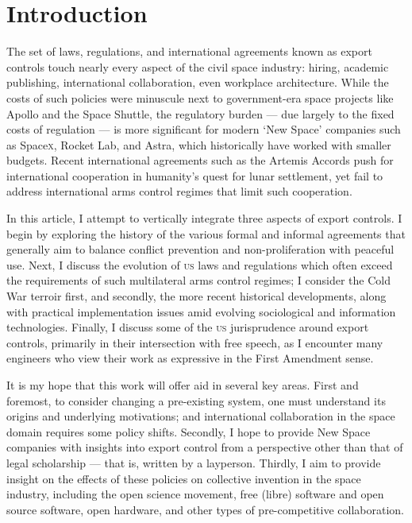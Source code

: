 \documentclass[preprint,twocolumn,5p]{elsarticle}
\begin{document}
\maketitle

\section{Introduction}
The set of laws, regulations, and international agreements known as export controls touch nearly every aspect of the civil space industry: hiring, academic publishing, international collaboration, even workplace architecture. While the costs of such policies were minuscule next to government-era space projects like Apollo and the Space Shuttle, the regulatory burden --- due largely to the fixed costs of regulation \citep{Bradford2004} --- is more significant for modern `New Space' companies such as Space\textsc{x}, Rocket Lab, and Astra, which historically have worked with smaller budgets. Recent international agreements such as the Artemis Accords push for international cooperation in humanity's quest for lunar settlement, yet fail to address international arms control regimes that limit such cooperation.

In this article, I attempt to vertically integrate three aspects of export controls. I begin by exploring the history of the various formal and informal agreements that generally aim to balance conflict prevention and non-proliferation with peaceful use. Next, I discuss the evolution of \textsc{us} laws and regulations which often exceed the requirements of such multilateral arms control regimes; I consider the Cold War terroir first, and secondly, the more recent historical developments, along with practical implementation issues amid evolving sociological and information technologies. Finally, I discuss some of the \textsc{us} jurisprudence around export controls, primarily in their intersection with free speech, as I encounter many engineers who view their work as expressive in the First Amendment sense.

It is my hope that this work will offer aid in several key areas. First and foremost, to consider changing a pre-existing system, one must understand its origins and underlying motivations; and international collaboration in the space domain requires some policy shifts. Secondly, I hope to provide New Space companies with insights into export control from a perspective other than that of legal scholarship --- that is, written by a layperson. Thirdly, I aim to provide insight on the effects of these policies on collective invention in the space industry, including the open science movement, free (libre) software and open source software, open hardware, and other types of pre-competitive collaboration.
\end{document}
